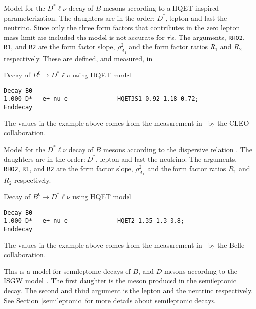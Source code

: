 

\Expl
Model for the $D^{*}\ell\nu$ decay of
$B$ mesons according to a HQET inspired parameterization. 
The daughters are in the order: $D^*$,
lepton and last the neutrino. Since only the three
form factors that contributes in the zero lepton mass
limit are included the model is not accurate for $\tau$'s.
The arguments, {\tt RHO2}, {\tt R1}, and {\tt R2} are the 
form factor slope, $\rho^2_{A_1}$ and the form factor
ratios $R_1$ and $R_2$ respectively. These are defined,
and measured, in~\cite{Dubo96}

\Example
Decay of $B^0\rightarrow D^*\ell\nu$ using HQET model
\begin{verbatim}
Decay B0
1.000 D*-  e+ nu_e              HQET3S1 0.92 1.18 0.72;
Enddecay
\end{verbatim}

\Notes
The values in the example above comes from the measurement 
in~\cite{Dubo96} by the CLEO collaboration.



\label{hqet2}



\Expl
Model for the $D^{*}\ell\nu$ decay of $B$ mesons according to 
the dispersive relation \cite{Cap98}. 
The daughters are in the order: $D^*$,
lepton and last the neutrino. 
The arguments, {\tt RHO2}, {\tt R1}, and {\tt R2} are the 
form factor slope, $\rho^2_{A_1}$ and the form factor
ratios $R_1$ and $R_2$ respectively. 

\Example
Decay of $B^0\rightarrow D^*\ell\nu$ using HQET model
\begin{verbatim}
Decay B0
1.000 D*-  e+ nu_e              HQET2 1.35 1.3 0.8;
Enddecay
\end{verbatim}

\Notes
The values in the example above comes from the measurement 
in~\cite{Abe02} by the Belle collaboration.




\label{isgw}



\Expl
This is a model for semileptonic decays of $B$, and $D$ mesons 
according to the ISGW model~\cite{Isgur89a}. The first daughter
is the meson produced in the semileptonic decay. The second and third
argument is the lepton and the neutrino respectively.
See Section~\ref{semileptonic} for more details about semileptonic
decays.

